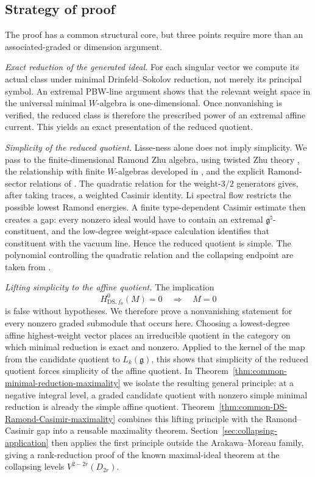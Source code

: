 \documentclass[11pt,reqno]{amsart}
\theoremstyle{definition}
\theoremstyle{remark}
\begin{document}
\subsection{Strategy of proof}

The proof has a common structural core, but three points require more than
an associated-graded or dimension argument.

\smallskip
\noindent\emph{Exact reduction of the generated ideal.}
For each singular vector we compute its actual class under minimal
Drinfeld--Sokolov reduction, not merely its principal symbol.  An extremal
PBW-line argument shows that the relevant weight space in the universal
minimal $W$-algebra is one-dimensional.  Once nonvanishing is verified,
the reduced class is therefore the prescribed power of an extremal affine
current.  This yields an exact presentation of the reduced quotient.

\smallskip
\noindent\emph{Simplicity of the reduced quotient.}
Lisse-ness alone does not imply simplicity.  We pass to the finite-dimensional
Ramond Zhu algebra, using twisted Zhu theory
\cite{DongLiMason1998}, the relationship with finite $W$-algebras developed
in \cite{DeSoleKac2006}, and the explicit Ramond-sector relations of
\cite{KacMosenederFrajriaPapi2025}.  The quadratic relation for the
weight-$3/2$ generators gives, after taking traces, a weighted Casimir
identity.  Li spectral flow \cite{Li2012} restricts the possible lowest
Ramond energies.  A finite type-dependent Casimir estimate then creates a
gap: every nonzero ideal would have to contain an extremal
$\mathfrak g^\natural$-constituent, and the low-degree weight-space
calculation identifies that constituent with the vacuum line.  Hence the
reduced quotient is simple.  The polynomial controlling the quadratic
relation and the collapsing endpoint are taken from
\cite{AdamovicKacMosenederFrajriaPapiPerse2018}.

\smallskip
\noindent\emph{Lifting simplicity to the affine quotient.}
The implication
\[
  H^0_{\mathrm{DS},f_\theta}(M)=0\quad\Longrightarrow\quad M=0
\]
is false without hypotheses.  We therefore prove a nonvanishing statement
for every nonzero graded submodule that occurs here.  Choosing a
lowest-degree affine highest-weight vector places an irreducible quotient
in the category on which minimal reduction is exact and nonzero.  Applied
to the kernel of the map from the candidate quotient to
$L_k(\mathfrak g)$, this shows that simplicity of the reduced quotient
forces simplicity of the affine quotient.  In
Theorem~\ref{thm:common-minimal-reduction-maximality} we isolate the resulting
general principle: at a negative integral level, a graded candidate quotient
with nonzero simple minimal reduction is already the simple affine quotient.
Theorem~\ref{thm:common-DS-Ramond-Casimir-maximality} combines this lifting
principle with the Ramond--Casimir gap into a reusable maximality theorem.
Section~\ref{sec:collapsing-application} then applies the first principle
outside the Arakawa--Moreau family, giving a rank-reduction proof of the
known maximal-ideal theorem at the collapsing levels
$V^{2-2r}(D_{2r})$.
\end{document}
